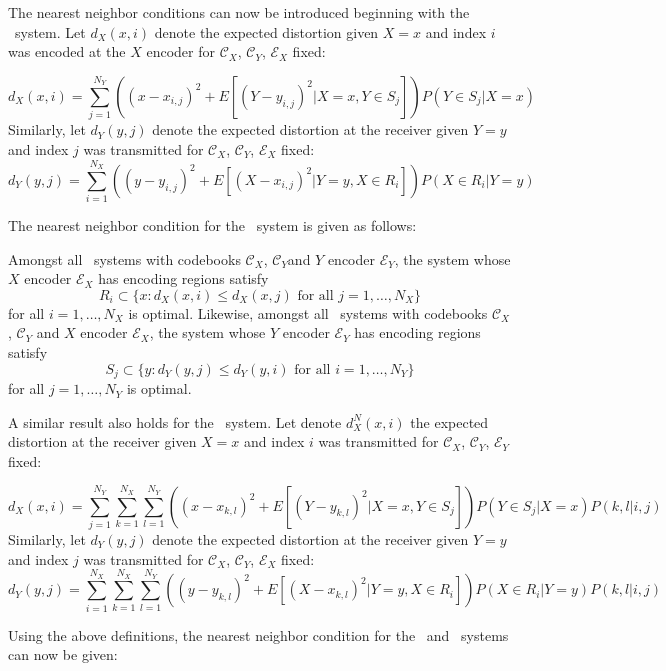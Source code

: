 The nearest neighbor conditions can now be introduced beginning with the \sysII\ system. Let $d_X(x,i)$ denote the expected distortion given $X=x$ and index $i$ was encoded at the $X$ encoder for $\mathcal{C}_X$, $\mathcal{C}_Y$, $\mathcal{E}_X$ fixed:

\begin{equation}
d_X(x,i)= \sum_{j=1}^{N_Y} ( {(x-x_{i,j})}^2 + E[{(Y-y_{i,j})}^2|X=x,Y\in S_j])P(Y \in S_j|X=x) \end{equation}
Similarly, let $d_Y(y,j)$ denote the expected distortion at the receiver given $Y=y$ and index $j$ was transmitted for $\mathcal{C}_X$, $\mathcal{C}_Y$, $\mathcal{E}_X$ fixed:
\begin{equation}
d_Y(y,j)= \sum_{i=1}^{N_X} ( {(y-y_{i,j})}^2 + E[{(X-x_{i,j})}^2|Y=y,X\in R_i])P(X \in R_i|Y=y) \end{equation}

The nearest neighbor condition for the \sysIJ\ system is given as follows:

\begin{theorem}
Amongst all \sysIJ\ systems with codebooks $\mathcal{C}_X$, $\mathcal{C}_Y$and $Y$ encoder $\mathcal{E}_Y$, the system whose $X$ encoder $\mathcal{E}_X$ has encoding regions satisfy
\begin{equation}
R_i \subset \{ x : d_X(x,i) \le d_X(x,j) \text{ for all } j=1,\ldots,N_X \}
\end{equation}
for all $i=1,\ldots,N_X$ is optimal. Likewise, amongst all \sysIJ\ systems with codebooks $\mathcal{C}_X$, $\mathcal{C}_Y$ and $X$ encoder $\mathcal{E}_X$, the system whose $Y$ encoder $\mathcal{E}_Y$ has encoding regions satisfy
\begin{equation}
S_j \subset \{ y : d_Y(y,j) \le d_Y(y,i) \text{ for all } i=1,\ldots,N_Y \}
\end{equation}
for all $j=1,\ldots,N_Y$ is optimal.
\end{theorem}

A similar result also holds for the \sysIJN\ system. Let denote $d_X^N(x,i)$ the expected distortion at the receiver given $X=x$ and index $i$ was transmitted for $\mathcal{C}_X$, $\mathcal{C}_Y$, $\mathcal{E}_Y$ fixed:

\begin{equation}
d_X(x,i)= \sum_{j=1}^{N_Y} \sum_{k=1}^{N_X} \sum_{l=1}^{N_Y} ( {(x-x_{k,l})}^2 + E[{(Y-y_{k,l})}^2|X=x,Y\in S_j])P(Y \in S_j|X=x) P(k,l|i,j)
\end{equation}
Similarly, let $d_Y(y,j)$ denote the expected distortion at the receiver given $Y=y$ and index $j$ was transmitted for $\mathcal{C}_X$, $\mathcal{C}_Y$, $\mathcal{E}_X$ fixed:
\begin{equation}
d_Y(y,j)= \sum_{i=1}^{N_X} \sum_{k=1}^{N_X} \sum_{l=1}^{N_Y} ( {(y-y_{k,l})}^2 + E[{(X-x_{k,l})}^2|Y=y,X\in R_i])P(X \in R_i|Y=y) P(k,l|i,j)
\end{equation}

Using the above definitions, the nearest neighbor condition for the \sysII\ and \sysIIN\ systems can now be given:

\begin{theorem}

\end{theorem}
